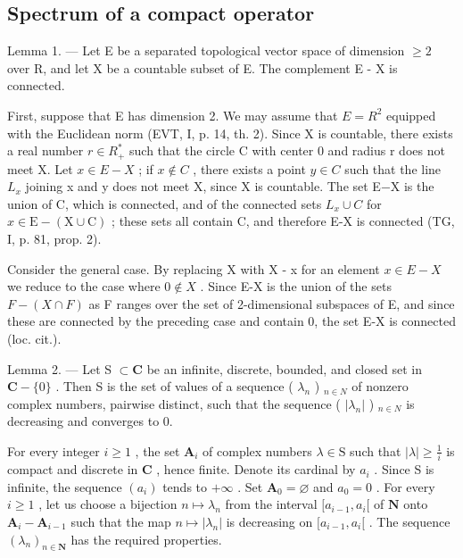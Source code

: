 \subsection{Spectrum of a compact operator}

Lemma 1. --- Let E be a separated topological vector space of dimension \(\geqslant 2\) over R, and let X be a countable subset of E. The complement E - X is connected.

First, suppose that E has dimension 2. We may assume that \(E = R^{2}\) equipped with the Euclidean norm (EVT, I, p. 14, th. 2). Since X is countable, there exists a real number \(r \in R_{+}^{*}\) such that the circle C with center 0 and radius r does not meet X. Let \(x \in E - X\) ; if \(x \notin C\) , there exists a point \(y \in C\) such that the line \(L_{x}\) joining x and y does not meet X, since X is countable. The set E−X is the union of C, which is connected, and of the connected sets \(L_{x} \cup C\) for \(x \in \mathrm{E} - (\mathrm{X} \cup \mathrm{C})\) ; these sets all contain C, and therefore E-X is connected (TG, I, p. 81, prop. 2).

Consider the general case. By replacing X with X - x for an element \(x \in E - X\) we reduce to the case where \(0 \notin X\) . Since E-X is the union of the sets \(F - (X \cap F)\) as F ranges over the set of 2-dimensional subspaces of E, and since these are connected by the preceding case and contain 0, the set E-X is connected (loc. cit.).

Lemma 2. --- Let S \(\subset \mathbf{C}\) be an infinite, discrete, bounded, and closed set in \(\mathbf{C} - \{0\}\) . Then S is the set of values of a sequence ( \(\lambda_{n}\) ) \(_{n\in N}\) of nonzero complex numbers, pairwise distinct, such that the sequence ( \(|\lambda_{n}|\) ) \(_{n\in N}\) is decreasing and converges to 0.

For every integer \(i \geqslant 1\) , the set \(\mathbf{A}_i\) of complex numbers \(\lambda \in \mathrm{S}\) such that \(|\lambda| \geqslant \frac{1}{i}\) is compact and discrete in \(\mathbf{C}\) , hence finite. Denote its cardinal by \(a_i\) . Since S is infinite, the sequence \((a_i)\) tends to \(+\infty\) . Set \(\mathbf{A}_0 = \varnothing\) and \(a_0 = 0\) . For every \(i \geqslant 1\) , let us choose a bijection \(n \mapsto \lambda_n\) from the interval \([a_{i-1}, a_i[\) of \(\mathbf{N}\) onto \(\mathbf{A}_i - \mathbf{A}_{i-1}\) such that the map \(n \mapsto |\lambda_n|\) is decreasing on \([a_{i-1}, a_i[\) . The sequence \((\lambda_n)_{n \in \mathbf{N}}\) has the required properties.

